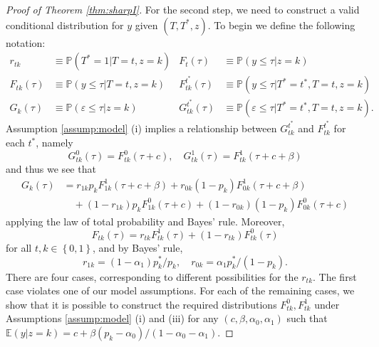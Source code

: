 \begin{proof}[Proof of Theorem \ref{thm:sharpI}]
For the second step, we need to construct a valid conditional distribution for $y$ given $(T,T^*,z)$.
To begin we define the following notation:
\begin{align*}
r_{tk} &\equiv \mathbb{P}(T^*=1|T=t,z=k) &
F_{t}(\tau) &\equiv \mathbb{P}(y \leq \tau|z=k) \\
F_{tk}(\tau) &\equiv \mathbb{P}(y \leq \tau|T=t, z=k) & 
F_{tk}^{t^*}(\tau) &\equiv \mathbb{P}(y \leq \tau|T^*=t^*,T=t, z=k)\\
G_k(\tau) &\equiv \mathbb{P}(\varepsilon \leq \tau|z=k) &
G^{t^*}_{tk}(\tau) &\equiv \mathbb{P}(\varepsilon \leq \tau|T^*=t^*, T=t,z=k).
\end{align*}
Assumption \ref{assump:model} (i) implies a relationship between $G^{t^*}_{tk}$ and $F^{t^*}_{tk}$ for each $t^*$, namely 
\begin{equation}
  G^0_{tk}(\tau) = F^0_{tk}(\tau + c), \quad
  G^1_{tk}(\tau) = F^1_{tk}(\tau + c + \beta)
  \label{eq:Gtstartk}
\end{equation}
and thus we see that
\begin{align}
  G_k(\tau) &= r_{1k}p_k F^1_{1k}(\tau + c + \beta) + r_{0k}(1 - p_k) F^1_{0k}(\tau + c + \beta) \nonumber \\
  &\quad +  (1 - r_{1k})p_k F^0_{1k}(\tau + c) + (1 - r_{0k})(1 - p_k) F^0_{0k}(\tau + c)
  \label{eq:Gk}
\end{align}
applying the law of total probability and Bayes' rule.
Moreover,
\begin{equation}
  F_{tk}(\tau) = r_{tk} F_{tk}^1(\tau) + (1 - r_{tk}) F_{tk}^0(\tau)
  \label{eq:Ftk}
\end{equation}
for all $t,k \in \left\{ 0,1 \right\}$, and by Bayes' rule,
\begin{equation}
  r_{1k} = (1 - \alpha_1)p_k^*/p_k, \quad
  r_{0k} = \alpha_1p_k^*/(1 - p_k).
  \label{eq:rtk}
\end{equation}
There are four cases, corresponding to different possibilities for the  $r_{tk}$.
The first case violates one of our model assumptions.
For each of the remaining cases, we show that it is possible to construct the required distributions $F_{tk}^0, F_{tk}^1$ under Assumptions \ref{assump:model} (i) and (iii) for any $(c,\beta,\alpha_0, \alpha_1)$ such that $\mathbb{E}(y|z=k) = c + \beta(p_k - \alpha_0)/(1 - \alpha_0 - \alpha_1)$.


\end{proof}
